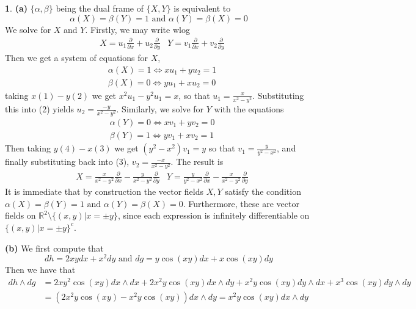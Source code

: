 \documentclass[10.5pt]{article}
\theoremstyle{definition}
\newtheorem{pb}{}
\newcommand{\set}[1]{\{#1\}}
\newcommand{\tand}{\text{ and }}
\newcommand{\parx}{\frac{\partial}{\partial x}}
\newcommand{\pary}{\frac{\partial}{\partial y}}
\begin{document}
    \begin{pb}
        \textbf{(a)}
            \(\set{\alpha,\beta}\) being the dual frame of \(\set{X,Y}\) is equivalent to
            \[\alpha(X) = \beta(Y) = 1 \tand \alpha(Y) = \beta(X) = 0\]
            We solve for \(X\) and \(Y\). Firstly, we may write wlog
            \begin{align*}
                &X = u_1\parx + u_2\pary &Y = v_1\parx + v_2\pary
            \end{align*}
            Then we get a system of equations for \(X\),
            \begin{align}
                &\alpha(X) = 1 \iff xu_1 + yu_2 = 1 \\
                &\beta(X) = 0 \iff yu_1 + xu_2 = 0
            \end{align}
            taking \(x(1) - y(2)\) we get \(x^2u_1 - y^2u_1 = x\), so that
            \(u_1 = \frac{x}{x^2 - y^2}\). Substituting this into (2) yields \(u_2 = \frac{-y}{x^2-y^2}\). Similarly, we solve for \(Y\) with the equations
            \begin{align}
                &\alpha(Y) = 0 \iff xv_1 + yv_2 = 0 \\
                &\beta(Y) = 1 \iff yv_1 + xv_2 = 1
            \end{align}
            Then taking \(y(4) - x(3)\) we get \((y^2 - x^2)v_1 = y\) so that \(v_1 = \frac{y}{y^2 - x^2}\), and finally substituting back into (3), \(v_2 = \frac{-x}{x^2 - y^2}\). The result is
            \begin{align*}
                &X = \frac{x}{x^2 - y^2}\parx - \frac{y}{x^2-y^2}\pary &Y = \frac{y}{y^2 - x^2}\parx - \frac{x}{x^2 - y^2}\pary
            \end{align*}
            It is immediate that by construction the vector fields \(X,Y\) satisfy the condition \(\alpha(X) = \beta(Y) = 1 \tand \alpha(Y) = \beta(X) = 0\). Furthermore, these are vector fields on \(\mathbb{R}^2\setminus\set{(x,y)\vert x = \pm y}\), since each expression is infinitely differentiable on \(\set{(x,y)\vert x = \pm y}^c\). 

            \textbf{(b)} We first compute that 
            \[dh = 2xy dx + x^2 dy \tand dg = y\cos(xy)dx + x\cos(xy)dy\]
            Then we have that
            \begin{align*}
                dh \wedge dg &= 2xy^2\cos(xy)dx \wedge dx + 2x^2y\cos(xy)dx \wedge dy + x^2y\cos(xy)dy\wedge dx
                + x^3\cos(xy)dy\wedge dy \\
                &= (2x^2y\cos(xy) - x^2y\cos(xy))dx\wedge dy = x^2y\cos(xy)dx\wedge dy
            \end{align*}
    \end{pb}
\end{document}
